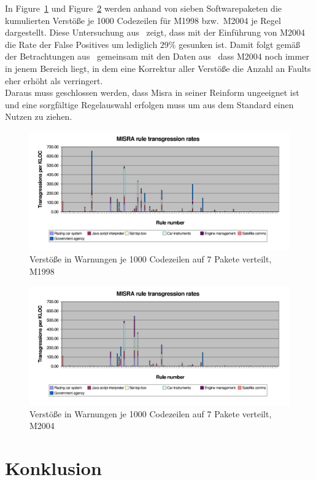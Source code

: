 \documentclass[a4paper,UKenglish,cleveref, autoref]{templates/lipics-v2019}
\begin{document}
    In Figure~\ref{fig:1998-transgression-rates} und Figure~\ref{fig:2004-transgression-rates} werden anhand von sieben
    Softwarepaketen die kumulierten Verstöße je 1000 Codezeilen für M1998 bzw.\ M2004 je Regel dargestellt.
    Diese Untersuchung aus~\cite{hatton2007language} zeigt, dass mit der Einführung von M2004 die Rate der False Positives
    um lediglich $29\%$ gesunken ist.
    Damit folgt gemäß der Betrachtungen aus~\cite{hatton2007language} gemeinsam mit den Daten aus~\cite{transgression-data}
    dass M2004 noch immer in jenem Bereich liegt, in dem eine Korrektur aller Verstöße die Anzahl an Faults
    eher erhöht als verringert.\\
    Daraus muss geschlossen werden, dass Misra in seiner Reinform ungeeignet ist und eine sorgfältige Regelauswahl erfolgen
    muss um aus dem Standard einen Nutzen zu ziehen.

    \begin{figure}[H]
        \centering
        \captionsetup{justification=centering,margin=2cm}
        \includegraphics[width=\textwidth]{graphics/1998-transgression-rates.png}
        \caption{Verstöße in Warnungen je 1000 Codezeilen auf 7 Pakete verteilt, M1998\cite{hatton2007language}}
        \label{fig:1998-transgression-rates}
    \end{figure}

    \begin{figure}[H]
        \centering
        \captionsetup{justification=centering,margin=2cm}
        \includegraphics[width=\textwidth]{graphics/2004-transgression-rates.png}
        \caption{Verstöße in Warnungen je 1000 Codezeilen auf 7 Pakete verteilt, M2004\cite{hatton2007language}}
        \label{fig:2004-transgression-rates}
    \end{figure}

    \section{Konklusion}
    \label{sec:konklusion}




    
\end{document}
